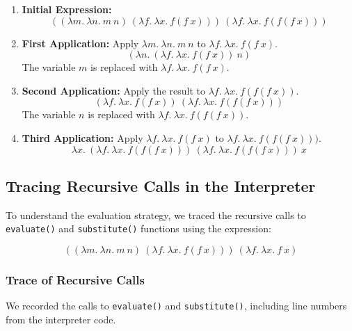 \documentclass{article}
\begin{document}
\begin{enumerate}
    \item \textbf{Initial Expression:}
    \[
    ((\lambda m.\ \lambda n.\ m\ n)\ (\lambda f.\ \lambda x.\ f(f\ x)))\ (\lambda f.\ \lambda x.\ f(f(f\ x)))
    \]

    \item \textbf{First Application:} Apply \(\lambda m.\ \lambda n.\ m\ n\) to \(\lambda f.\ \lambda x.\ f(f\ x)\).
    \[
    (\lambda n.\ (\lambda f.\ \lambda x.\ f(f\ x))\ n)
    \]
    The variable \(m\) is replaced with \(\lambda f.\ \lambda x.\ f(f\ x)\).

    \item \textbf{Second Application:} Apply the result to \(\lambda f.\ \lambda x.\ f(f(f\ x))\).
    \[
    (\lambda f.\ \lambda x.\ f(f\ x))\ (\lambda f.\ \lambda x.\ f(f(f\ x)))
    \]
    The variable \(n\) is replaced with \(\lambda f.\ \lambda x.\ f(f(f\ x))\).

    \item \textbf{Third Application:} Apply \(\lambda f.\ \lambda x.\ f(f\ x)\) to \(\lambda f.\ \lambda x.\ f(f(f\ x)))\).
    \[
    \lambda x.\ (\lambda f.\ \lambda x.\ f(f(f\ x)))\ (\lambda f.\ \lambda x.\ f(f(f\ x)))\ x
    \]

\end{enumerate}

\subsection*{Tracing Recursive Calls in the Interpreter}

To understand the evaluation strategy, we traced the recursive calls to \texttt{evaluate()} and \texttt{substitute()} functions using the expression:

\[
((\lambda m.\ \lambda n.\ m\ n)\ (\lambda f.\ \lambda x.\ f(f\ x)))\ (\lambda f.\ \lambda x.\ f\ x)
\]

\subsubsection*{Trace of Recursive Calls}

We recorded the calls to \texttt{evaluate()} and \texttt{substitute()}, including line numbers from the interpreter code.
\end{document}
